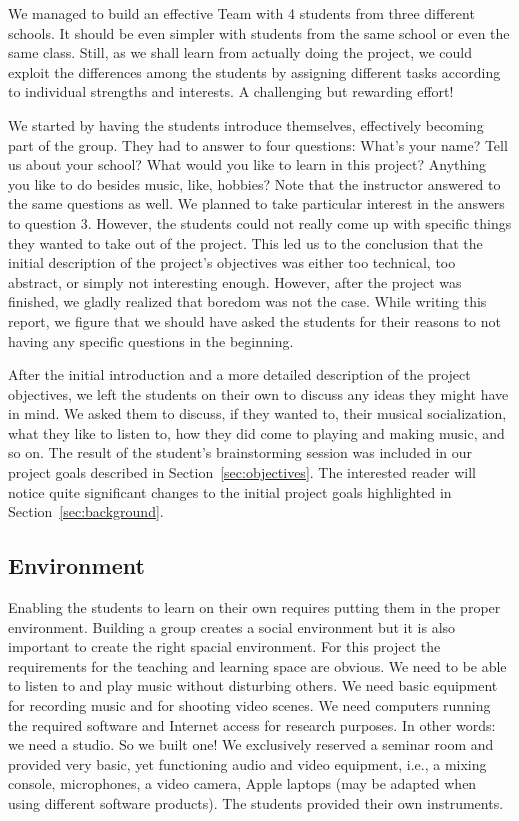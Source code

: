 \documentclass[onecolumn,nocopyrightspace,preprint]{sigplanconf}
\begin{document}
We managed to build an effective Team with 4 students from three different
schools.  It should be even simpler with students from the same school or even
the same class. Still, as we shall learn from actually doing the project, we
could exploit the differences among the students by assigning different tasks
according to individual strengths and interests. A challenging but rewarding
effort!

We started by having the students introduce themselves, effectively becoming
part of the group. They had to answer to four questions: What's your name?
Tell us about your school?  What would you like to learn in this project?
Anything you like to do besides music, like, hobbies? Note that the instructor
answered to the same questions as well.  We planned to take particular
interest in the answers to question 3. However, the students could not really
come up with specific things they wanted to take out of the project. This led
us to the conclusion that the initial description of the project's objectives
was either too technical, too abstract, or simply not interesting enough.
However, after the project was finished, we gladly realized that boredom was
not the case. While writing this report, we figure that we should have asked
the students for their reasons to not having any specific questions in the
beginning.

After the initial introduction and a more detailed description of the project
objectives, we left the students on their own to discuss any ideas they might
have in mind. We asked them to discuss, if they wanted to, their musical
socialization, what they like to listen to, how they did come to playing and
making music, and so on. The result of the student's brainstorming session
was included in our project goals described in Section~\ref{sec:objectives}.
The interested reader will notice quite significant changes to the initial
project goals highlighted in Section~\ref{sec:background}.


\subsection{Environment}

Enabling the students to learn on their own requires putting them in the
proper environment. Building a group creates a social environment but it is
also important to create the right spacial environment. For this project the
requirements for the teaching and learning space are obvious. We need to be
able to listen to and play music without disturbing others. We need basic
equipment for recording music and for shooting video scenes. We need computers
running the required software and  Internet access for research purposes. In
other words: we need a studio. So we built one! We exclusively reserved a
seminar room and provided very basic, yet functioning audio and video
equipment, i.e., a mixing console, microphones, a video camera, Apple laptops
(may be adapted when using different software products). The students provided
their own instruments.
\end{document}
